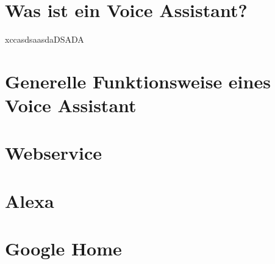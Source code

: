 

\section{Was ist ein Voice Assistant?}
xccasdsaasdaDSADA
\section{Generelle Funktionsweise eines Voice Assistant}

\section{Webservice}

\section{Alexa}

\section{Google Home}

